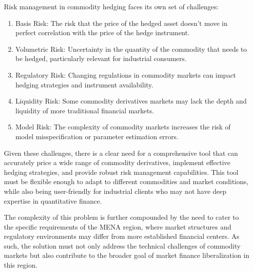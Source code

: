 \documentclass[12pt]{article}
\begin{document}
Risk management in commodity hedging faces its own set of challenges:
\begin{enumerate}

\item Basis Risk: The risk that the price of the hedged asset doesn't move in perfect correlation with the price of the hedge instrument.
\item Volumetric Risk: Uncertainty in the quantity of the commodity that needs to be hedged, particularly relevant for industrial consumers.
\item Regulatory Risk: Changing regulations in commodity markets can impact hedging strategies and instrument availability.
\item Liquidity Risk: Some commodity derivatives markets may lack the depth and liquidity of more traditional financial markets.
\item Model Risk: The complexity of commodity markets increases the risk of model misspecification or parameter estimation errors.
\end{enumerate}
Given these challenges, there is a clear need for a comprehensive tool that can accurately price a wide range of commodity derivatives, implement effective hedging strategies, and provide robust risk management capabilities. This tool must be flexible enough to adapt to different commodities and market conditions, while also being user-friendly for industrial clients who may not have deep expertise in quantitative finance.
\\\par
The complexity of this problem is further compounded by the need to cater to the specific requirements of the MENA region, where market structures and regulatory environments may differ from more established financial centers. As such, the solution must not only address the technical challenges of commodity markets but also contribute to the broader goal of market finance liberalization in this region.
\end{document}
